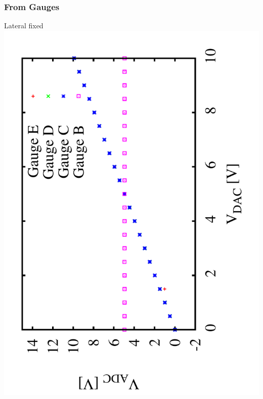 \documentclass[a4paper,11pt]{book}
\begin{document}
\subsubsection{From Gauges}
Lateral fixed
 \includegraphics[angle=-90,scale=0.20]{image_ai_01.pdf}
\end{document}
